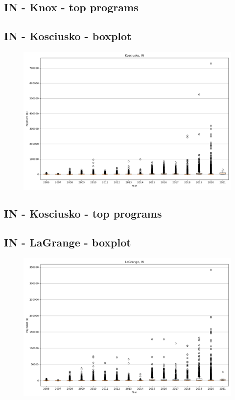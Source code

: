 \subsection*{IN - Knox - top programs}

\newpage
\subsection*{IN - Kosciusko - boxplot}
\begin{figure}[h]
\centering
\includegraphics[width=7in]{../output/boxplots/counties/Kosciusko-IN_boxplot.png}
\end{figure}


\subsection*{IN - Kosciusko - top programs}

\newpage
\subsection*{IN - LaGrange - boxplot}
\begin{figure}[h]
\centering
\includegraphics[width=7in]{../output/boxplots/counties/LaGrange-IN_boxplot.png}
\end{figure}


